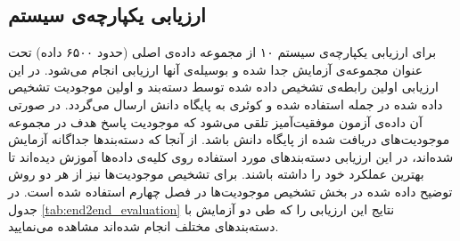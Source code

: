 \subsection{ارزیابی یکپارچه‌ی سیستم}
برای ارزیابی یکپارچه‌ی سیستم ۱۰\lr{\%} از مجموعه داده‌ی اصلی (حدود ۶۵۰۰ داده) تحت عنوان مجموعه‌ی آزمایش جدا شده و بوسیله‌ی آنها ارزیابی انجام می‌شود. در این ارزیابی اولین رابطه‌ی تشخیص داده شده توسط دسته‌بند و اولین موجودیت تشخیص داده شده در جمله استفاده شده و کوئری به پایگاه دانش ارسال می‌گردد. در صورتی آن داده‌ی آزمون موفقیت‌آمیز تلقی می‌شود که موجودیت پاسخ هدف در مجموعه موجودیت‌های دریافت شده از پایگاه دانش باشد. از آنجا که دسته‌بندها جداگانه آزمایش شده‌اند،‌ در این ارزیابی دسته‌بندهای مورد استفاده روی کلیه‌ی داده‌ها آموزش دیده‌اند تا بهترین عملکرد خود را داشته باشند. برای تشخیص موجودیت‌ها نیز از هر دو روش توضیح داده شده در بخش تشخیص موجودیت‌ها در فصل چهارم استفاده شده است.
در جدول \ref{tab:end2end_evaluation} نتایج این ارزیابی را که طی دو آزمایش با دسته‌بندهای مختلف انجام شده‌اند مشاهده می‌نمایید.

